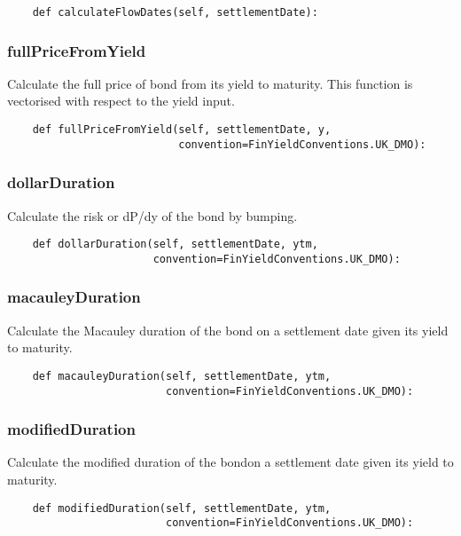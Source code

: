 \documentclass[twoside,11pt]{book}
\begin{document}
\begin{lstlisting}
    def calculateFlowDates(self, settlementDate):
\end{lstlisting}

\subsubsection*{{\bf fullPriceFromYield}}
Calculate the full price of bond from its yield to maturity. This function is vectorised with respect to the yield input.  

\begin{lstlisting}
    def fullPriceFromYield(self, settlementDate, y,
                           convention=FinYieldConventions.UK_DMO):
\end{lstlisting}

\subsubsection*{{\bf dollarDuration}}
Calculate the risk or dP/dy of the bond by bumping.  

\begin{lstlisting}
    def dollarDuration(self, settlementDate, ytm,
                       convention=FinYieldConventions.UK_DMO):
\end{lstlisting}

\subsubsection*{{\bf macauleyDuration}}
Calculate the Macauley duration of the bond on a settlement date given its yield to maturity.  

\begin{lstlisting}
    def macauleyDuration(self, settlementDate, ytm,
                         convention=FinYieldConventions.UK_DMO):
\end{lstlisting}

\subsubsection*{{\bf modifiedDuration}}
Calculate the modified duration of the bondon a settlement date given its yield to maturity.  

\begin{lstlisting}
    def modifiedDuration(self, settlementDate, ytm,
                         convention=FinYieldConventions.UK_DMO):
\end{lstlisting}
\end{document}
